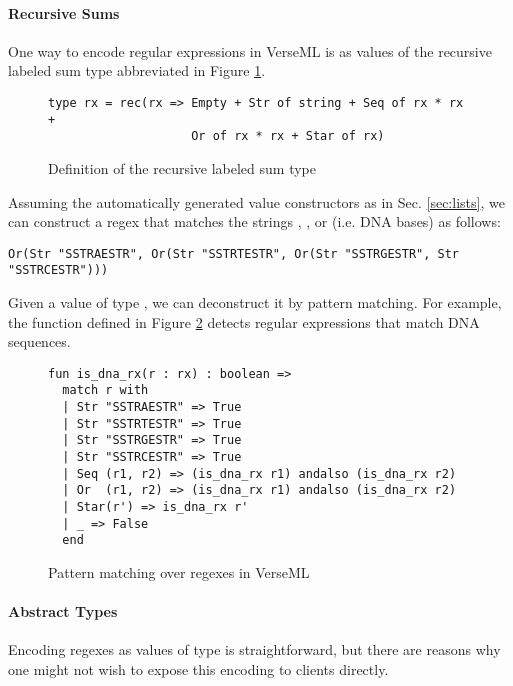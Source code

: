 \paragraph{Recursive Sums}
One way to encode regular expressions in VerseML is as values of the recursive labeled sum type abbreviated  in Figure \ref{fig:datatype-rx}.

\begin{figure}[ht]
\begin{lstlisting}[numbers=none]
type rx = rec(rx => Empty + Str of string + Seq of rx * rx +
                    Or of rx * rx + Star of rx)
\end{lstlisting}
\caption{Definition of the recursive labeled sum type }
\label{fig:datatype-rx}
\end{figure}
Assuming the automatically generated value constructors as in Sec. \ref{sec:lists}, we can construct a regex that matches the strings , ,  or  (i.e. DNA bases) as follows:
\begin{lstlisting}[numbers=none]
Or(Str "SSTRAESTR", Or(Str "SSTRTESTR", Or(Str "SSTRGESTR", Str "SSTRCESTR")))
\end{lstlisting}

Given a value of type , we can deconstruct it by pattern matching. For example, the function  defined in Figure \ref{fig:is_dna_rx} detects regular expressions that match DNA sequences.

\begin{figure}[h]
\begin{lstlisting}[numbers=none]
fun is_dna_rx(r : rx) : boolean => 
  match r with 
  | Str "SSTRAESTR" => True
  | Str "SSTRTESTR" => True
  | Str "SSTRGESTR" => True
  | Str "SSTRCESTR" => True
  | Seq (r1, r2) => (is_dna_rx r1) andalso (is_dna_rx r2)
  | Or  (r1, r2) => (is_dna_rx r1) andalso (is_dna_rx r2)
  | Star(r') => is_dna_rx r'
  | _ => False 
  end
\end{lstlisting}
\caption{Pattern matching over regexes in VerseML}
\label{fig:is_dna_rx}
\end{figure}


\paragraph{Abstract Types} Encoding regexes as values of type  is straightforward, but there are reasons why one might not wish to expose this encoding to clients directly. 

